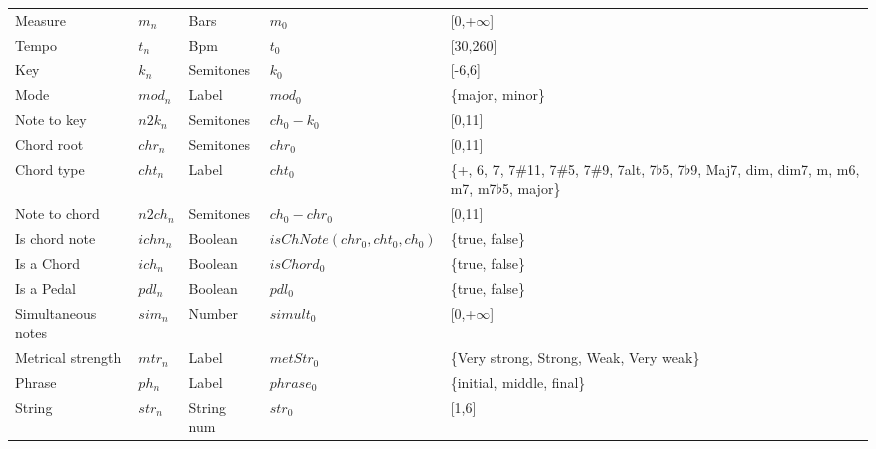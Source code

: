 \begin{table}
{\begin{tabular}{l l l l p{2.5cm} }
    Measure & $m_n$ & Bars & $m_0$ & [0,+$\infty$] \\
    Tempo & $t_n$ & Bpm & $t_0$ & [30,260] \\
    Key & $k_n$ & Semitones & $k_0$ & [-6,6] \\
 	Mode & $mod_n$ & Label & $mod_0$ & \{major, minor\} \\
  	Note to key & $n2k_n$ & Semitones & $ch_0-k_0$ & [0,11] \\
 	Chord root & $chr_n$ & Semitones & $chr_0$ & [0,11] \\
    Chord type & $cht_n$ & Label & $cht_0$  & \{+, 6, 7, 7\#11, 7\#5, 7\#9, 7alt, 7$\flat$5, 7$\flat$9, Maj7, dim, dim7, m, m6, m7, m7$\flat$5, major\} \\
	Note to chord & $n2ch_n$ & Semitones & $ch_0-chr_0$ & [0,11] \\
 	Is chord note & $ichn_n$ & Boolean & $isChNote(chr_0,cht_0,ch_0)$ & \{true, false\} \\
    Is a Chord & $ich_n$ & Boolean & $isChord_0$ & \{true, false\} \\
    Is a Pedal & $pdl_n$ & Boolean & $pdl_0$ & \{true, false\} \\
    Simultaneous notes & $sim_n$ & Number & $simult_0$ & [0,+$\infty$] \\
 	Metrical strength & $mtr_n$ & Label & $metStr_0$ & \{Very strong, Strong, Weak, Very weak\} \\
 	Phrase & $ph_n$ & Label & $phrase_0$ & \{initial, middle, final\} \\
    String & $str_n$ & String num & $str_0$ & [1,6] \\

    \hline

  \end{tabular}
  }
\end{table}
